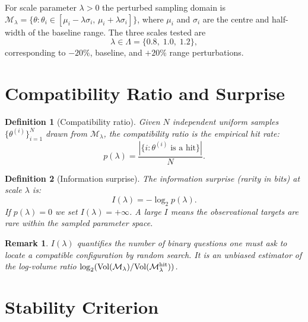 \documentclass[12pt]{article}
\newtheorem{definition}{Definition}[section]
\newtheorem{remark}{Remark}[section]
\newcommand{\calM}{\mathcal{M}}
\begin{document}
For scale parameter $\lambda>0$ the perturbed sampling domain is
$\calM_\lambda = \{\theta : \theta_i\in[\mu_i - \lambda\sigma_i,\,\mu_i + \lambda\sigma_i]\}$,
where $\mu_i$ and $\sigma_i$ are the centre and half-width of the baseline range.
The three scales tested are
\begin{equation}
  \lambda \in \Lambda = \{0.8,\; 1.0,\; 1.2\},
  \label{eq:scales}
\end{equation}
corresponding to $-20\%$, baseline, and $+20\%$ range perturbations.

\section{Compatibility Ratio and Surprise}

\begin{definition}[Compatibility ratio]
\label{def:compat_ratio}
Given $N$ independent uniform samples $\{\theta^{(i)}\}_{i=1}^N$ drawn from
$\calM_\lambda$, the \emph{compatibility ratio} is the empirical hit rate:
\begin{equation}
  p(\lambda) = \frac{|\{i : \theta^{(i)}\;\text{is a hit}\}|}{N}.
  \label{eq:p_lambda}
\end{equation}
\end{definition}

\begin{definition}[Information surprise]
\label{def:surprise}
The \emph{information surprise} (rarity in bits) at scale $\lambda$ is:
\begin{equation}
  I(\lambda) = -\log_2 p(\lambda).
  \label{eq:I_lambda}
\end{equation}
If $p(\lambda)=0$ we set $I(\lambda)=+\infty$.  A large $I$ means the observational
targets are rare within the sampled parameter space.
\end{definition}

\begin{remark}
$I(\lambda)$ quantifies the number of binary questions one must ask to locate a
compatible configuration by random search.  It is an unbiased estimator of the
log-volume ratio $\log_2(\mathrm{Vol}(\calM_\lambda)/\mathrm{Vol}(\calM_\lambda^{\rm hit}))$.
\end{remark}

\section{Stability Criterion}
\end{document}
